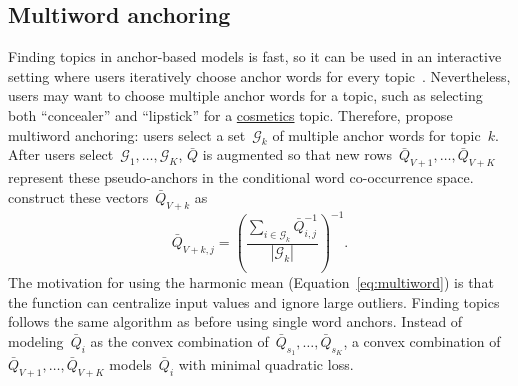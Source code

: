 \subsection{Multiword anchoring}
    \label{sec:multiword}

Finding topics in anchor-based models is fast, so it can be used in an
interactive setting where users iteratively choose anchor words for
every topic~\citep{lund-2017}.  Nevertheless, users may want to choose
multiple anchor words for a topic, such as selecting both
``concealer'' and ``lipstick'' for a \underline{cosmetics} topic.
Therefore,  propose multiword anchoring:
users select a set~$\mathcal{G}_k$ of multiple anchor
words for topic~$k$.  After users select~$\mathcal{G}_1,\dots,\mathcal{G}_K$, $\bar{Q}$
is augmented so that new rows~$\bar{Q}_{V+1},\dots,\bar{Q}_{V+K}$
represent these pseudo-anchors in the conditional word co-occurrence
space.   construct these vectors~$\bar{Q}_{V+k}$ as 
    \begin{equation}
        \label{eq:multiword}
        \bar{Q}_{V+k, j} = 
        \left( 
        \frac{\sum \limits_{i\in \mathcal{G}_k} \bar{Q}_{i, j}^{-1}}{ |\mathcal{G}_k|} \right)^{-1}.
    \end{equation}
The motivation for using the harmonic mean (Equation~\ref{eq:multiword}) is that the function can centralize input values and ignore large outliers. Finding topics follows the same algorithm as before using single word anchors.  Instead of modeling~$\bar{Q}_i$ as the convex combination of~$\bar{Q}_{s_1},\dots,\bar{Q}_{s_K}$, a convex combination of~$\bar{Q}_{V+1},\dots,\bar{Q}_{V+K}$ models~$\bar{Q}_i$ with minimal quadratic loss.
